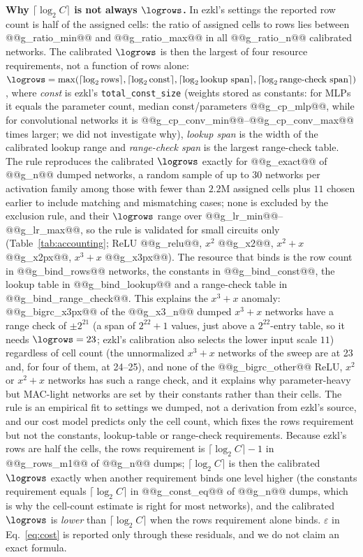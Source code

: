 \textbf{Why $\lceil\log_2 C\rceil$ is not always $\logrows$.}  In ezkl's settings the reported row count is half of the assigned cells: the ratio of assigned cells to rows lies between @@g_ratio_min@@ and @@g_ratio_max@@ in all @@g_ratio_n@@ calibrated networks.  The calibrated $\logrows$ is then
the largest of four resource requirements, not a function of rows alone: $\logrows=\max(\lceil\log_2\text{rows}\rceil,\lceil\log_2\text{const}\rceil,\lceil\log_2\text{lookup span}\rceil,\lceil\log_2\text{range-check span}\rceil)$,
where \emph{const} is ezkl's \texttt{total\_const\_size} (weights stored as constants: for MLPs it equals the parameter count, median const/parameters @@g_cp_mlp@@, while for convolutional networks it is @@g_cp_conv_min@@--@@g_cp_conv_max@@ times larger; we did not investigate why), \emph{lookup span} is the width of the calibrated lookup range and \emph{range-check span} is the largest range-check table.
The rule reproduces the calibrated $\logrows$ exactly for @@g_exact@@ of @@g_n@@ dumped networks, a random sample of up to $30$ networks per activation family among those with fewer than $2.2$M assigned cells plus $11$ chosen earlier to include matching and mismatching cases; none is excluded by the exclusion rule, and their $\logrows$ range over @@g_lr_min@@--@@g_lr_max@@, so the rule is validated for small circuits only (Table~\ref{tab:accounting}; ReLU @@g_relu@@, $x^2$ @@g_x2@@, $x^2{+}x$ @@g_x2px@@, $x^3{+}x$ @@g_x3px@@).
The resource that binds is the row count in @@g_bind_rows@@ networks, the constants in @@g_bind_const@@, the lookup table in @@g_bind_lookup@@ and a range-check table in @@g_bind_range_check@@.  This explains the $x^3{+}x$ anomaly: @@g_bigrc_x3px@@ of the @@g_x3_n@@ dumped $x^3{+}x$ networks have a range check of
$\pm2^{21}$ (a span of $2^{22}+1$ values, just above a $2^{22}$-entry table, so it needs $\logrows=23$; ezkl's calibration also selects the lower input scale $11$) regardless of cell count (the unnormalized $x^3{+}x$ networks of the sweep are at 23 and, for four of them, at 24--25), and none of the @@g_bigrc_other@@ ReLU, $x^2$ or $x^2{+}x$ networks has such a range check, and it explains why parameter-heavy but MAC-light networks are set by their constants rather than their cells.  The rule is an empirical fit to settings we dumped, not a derivation from
ezkl's source, and our cost model predicts only the cell count, which fixes the rows requirement but not the constants, lookup-table or range-check requirements.  Because ezkl's rows are half the cells, the rows requirement is $\lceil\log_2 C\rceil-1$ in @@g_rows_m1@@ of @@g_n@@ dumps; $\lceil\log_2 C\rceil$ is then the calibrated $\logrows$ exactly when another requirement binds one level higher (the constants requirement equals $\lceil\log_2 C\rceil$ in @@g_const_eq@@ of @@g_n@@ dumps, which is why the cell-count estimate is right for most networks), and the calibrated $\logrows$ is \emph{lower} than $\lceil\log_2 C\rceil$ when the rows requirement alone binds.  $\varepsilon$ in Eq.~\eqref{eq:cost} is reported
only through these residuals, and we do not claim an exact formula.





